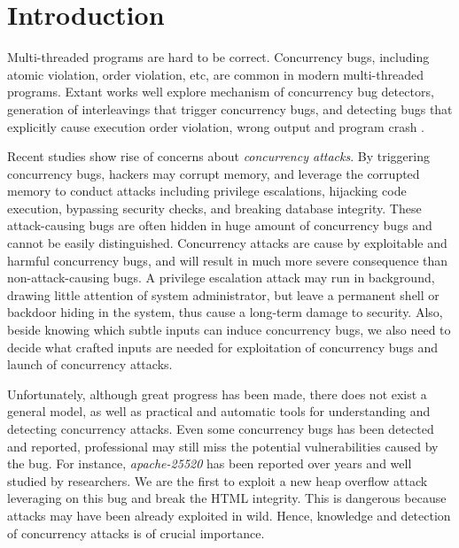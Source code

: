 \section{Introduction} \label{sec:intro}


Multi-threaded programs are hard to be correct. 
Concurrency bugs, including atomic violation, order violation, etc, are common in modern multi-threaded programs.
Extant works well explore mechanism of concurrency bug detectors, generation of interleavings that trigger concurrency bugs, and detecting bugs that explicitly cause execution order violation, wrong output and program crash
\cite{wu2015:collaborative,tsan,valgrind:pldi,lu:muvi:sosp,conseq:asplos11,conmem:asplos10}.

Recent studies\cite{acidrain:sigmod17,con:hotpar12} show rise of concerns about \emph{concurrency attacks}.
By triggering concurrency bugs, 
hackers may corrupt memory, and leverage the corrupted memory to conduct  
attacks including privilege escalations\cite{uselib-bug-12791,mysql-bug-14747}, hijacking code execution\cite{msiexploit}, bypassing security checks\cite{cve-2008-0034,cve-2010-0923,cve-2010-1754}, 
and breaking database integrity\cite{acidrain:sigmod17}.
These attack-causing bugs are often hidden in huge amount of concurrency bugs and cannot be easily distinguished. 
Concurrency attacks are cause by exploitable and harmful concurrency bugs, and will result in much more severe consequence than non-attack-causing bugs. 
A privilege escalation attack may run in background, drawing little attention of system administrator, 
but leave a permanent shell or backdoor hiding in the system, thus cause a long-term damage to security.
Also, beside knowing which subtle inputs can induce concurrency bugs, 
we also need to decide what  crafted inputs are needed for exploitation of concurrency bugs and launch of concurrency attacks. 



Unfortunately, although great progress has been made, there does not exist a general model,
as well as practical and automatic tools for understanding and detecting concurrency attacks. 
Even some concurrency bugs has been detected and reported, 
professional may still miss the potential vulnerabilities caused by the bug. 
For instance, \emph{apache-25520}\cite{apache-bug-25520} has been 
reported over years and well studied by researchers\cite{lu:concurrency-bugs}.  
We are the first to exploit a new heap overflow attack leveraging on this bug and break the HTML integrity. 
This is dangerous because attacks may have been already exploited in wild. 
Hence, knowledge and detection of concurrency attacks is of crucial importance. 

